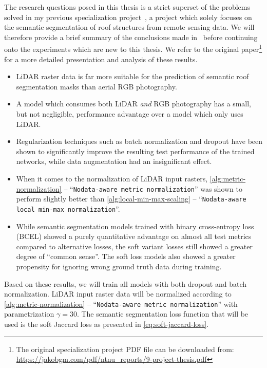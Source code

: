 The research questions posed in this thesis is a strict superset of the problems solved in my previous specialization project~\cite{specialization-project}, a project which solely focuses on the semantic segmentation of roof structures from remote sensing data.
We will therefore provide a brief summary of the conclusions made in~\cite{specialization-project} before continuing onto the experiments which are new to this thesis.
We refer to the original paper\footnote{The original specialization project PDF file can be downloaded from: \url{https://jakobgm.com/pdf/ntnu_reports/9-project-thesis.pdf}} for a more detailed presentation and analysis of these results.
%
\begin{itemize}
  \item LiDAR raster data is far more suitable for the prediction of semantic roof segmentation masks than aerial RGB photography.
  \item A model which consumes both LiDAR \emph{and} RGB photography has a small, but not negligible, performance advantage over a model which only uses LiDAR.
  \item Regularization techniques such as batch normalization and dropout have been shown to significantly improve the resulting test performance of the trained networks, while data augmentation had an insignificant effect.
  \item When it comes to the normalization of LiDAR input rasters, \cref{alg:metric-normalization} -- \enquote{\texttt{Nodata-aware metric normalization}} was shown to perform slightly better than \cref{alg:local-min-max-scaling} -- \enquote{\texttt{Nodata-aware local min-max normalization}}.
  \item While semantic segmentation models trained with binary cross-entropy loss (BCEL) showed a purely quantitative advantage on almost all test metrics compared to alternative losses, the soft variant losses still showed a greater degree of \enquote{common sense}.
  The soft loss models also showed a greater propensity for ignoring wrong ground truth data during training.
\end{itemize}
%
Based on these results, we will train all models with both dropout and batch normalization.
LiDAR input raster data will be normalized according to \cref{alg:metric-normalization} -- \enquote{\texttt{Nodata-aware metric normalization}} with parametrization $\gamma = 30$.
The semantic segmentation loss function that will be used is the soft Jaccard loss as presented in \cref{eq:soft-jaccard-loss}.
